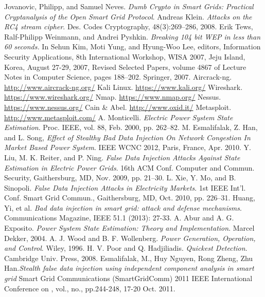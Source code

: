 \documentclass[11pt,oneside]{book}
\begin{document}
\begin{thebibliography}{99}
 Jovanovic, Philipp, and Samuel Neves. \emph{Dumb Crypto in Smart Grids: Practical Cryptanalysis of the Open Smart Grid Protocol}.
 Andreas Klein. \emph{Attacks on the RC4 stream cipher}. Des. Codes Cryptography, 48(3):269–286, 2008.
 Erik Tews, Ralf-Philipp Weinmann, and Andrei Pyshkin. \emph{Breaking 104 bit WEP in less than 60 seconds.} In Sehun Kim, Moti Yung, and Hyung-Woo Lee, editors, Information Security Applications, 8th International Workshop, WISA 2007, Jeju Island, Korea, August 27-29, 2007, Revised Selected Papers, volume 4867 of Lecture Notes in Computer Science, pages 188–202. Springer, 2007.
 Aircrack-ng. \url{http://www.aircrack-ng.org/}
 Kali Linux. \url{https://www.kali.org/}
 Wireshark. \url{https://www.wireshark.org/}
 Nmap. \url{https://www.nmap.org/}
 Nessus. \url{https://www.nessus.org/}
 Cain \& Abel. \url{http://www.oxid.it/}
 Metasploit. \url{http://www.metasploit.com/}
 A. Monticelli. \emph{Electric Power System State Estimation}. Proc. IEEE, vol. 88, Feb. 2000, pp. 262–82.
 M. Esmalifalak, Z. Han, and L. Song, \emph{Effect of Stealthy Bad Data Injection On Network Congestion In Market Based Power System}. IEEE WCNC 2012, Paris, France, Apr. 2010.
 Y. Liu, M. K. Reiter, and P. Ning. \emph{False Data Injection Attacks Against State Estimation in Electric Power Grids}. 16th ACM Conf. Computer and Commun. Security, Gaithersburg, MD, Nov. 2009, pp. 21–30.
 L. Xie, Y. Mo, and B. Sinopoli. \emph{False Data Injection Attacks in Electricity Markets}. 1st IEEE Int’l. Conf. Smart Grid Commun., Gaithersburg, MD, Oct. 2010, pp. 226–31.
 Huang, Yi, et al. \emph{Bad data injection in smart grid: attack and defense mechanisms}. Communications Magazine, IEEE 51.1 (2013): 27-33.
 A. Abur and A. G. Exposito. \emph{Power System State Estimation: Theory and Implementation}. Marcel Dekker, 2004.
 A. J. Wood and B. F. Wollenberg. \emph{Power Generation, Operation, and Control}. Wiley, 1996.
 H. V. Poor and Q. Hadjiliadis. \emph{Quickest Detection}. Cambridge Univ. Press, 2008.
 Esmalifalak, M., Huy Nguyen, Rong Zheng, Zhu Han.\emph{Stealth false data injection using independent component analysis in smart grid} Smart Grid Communications (SmartGridComm) 2011 IEEE International Conference on , vol., no., pp.244-248, 17-20 Oct. 2011.

\end{thebibliography}
\end{document}
